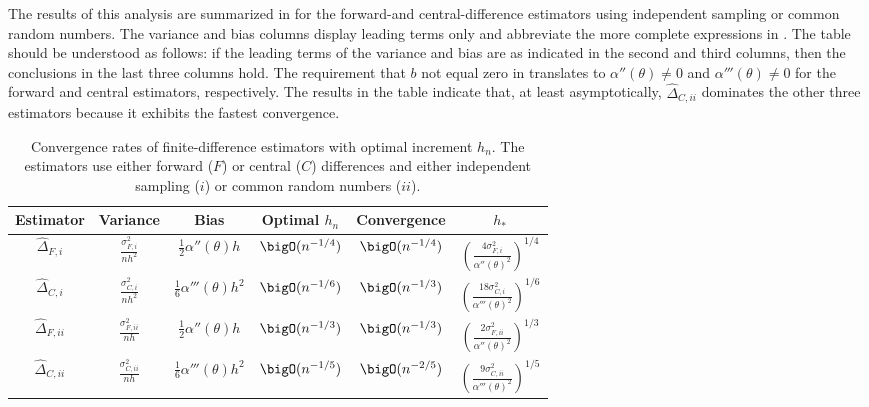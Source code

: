 The results of this analysis are summarized in  for the forward-and central-difference estimators using independent sampling or common random numbers. The variance and bias columns display leading terms only and abbreviate the more complete expressions in . The table should be understood as follows: if the leading terms of the variance and bias are as indicated in the second and third columns, then the conclusions in the last three columns hold. The requirement that \(b\) not equal zero in  translates to \(\alpha''(\theta) \neq 0\)
and \(\alpha'''(\theta) \neq 0\) for the forward and central estimators, respectively. The results in the table indicate that, at least asymptotically, \(\hat{\Delta}_{C,ii}\) dominates the other three estimators because it exhibits the fastest convergence.

\begin{table}[H]
	\centering
	\caption{Convergence rates of finite-difference estimators with optimal increment \(h_n\). The estimators use either forward (\(F\)) or central (\(C\)) differences and either independent sampling (\(i\)) or common random numbers (\(ii\)).}
	\label{tab:ConvergenceRates}
	\renewcommand{\arraystretch}{2.2}
	\begin{tabular}{cccccc}
		\toprule
		Estimator             & Variance                       & Bias                              & Optimal \(h_n\)     & Convergence       & \(h_*\)                                                             \\
		\midrule
		\(\hat{\Delta}_{F,i}\)  & \(\frac{\sigma_{F,i}^2}{n h^2}\) & \(\frac{1}{2}\alpha''(\theta)h\)    & \(\bigO(n^{-1/4})\) & \(\bigO(n^{-1/4})\) & \(\left(\frac{4\sigma_{F,i}^2}{\alpha''(\theta)^2}\right)^{1/4}\)   \\
		\(\hat{\Delta}_{C,i}\)  & \(\frac{\sigma_{C,i}^2}{n h^2}\) & \(\frac{1}{6}\alpha'''(\theta)h^2\) & \(\bigO(n^{-1/6})\) & \(\bigO(n^{-1/3})\) & \(\left(\frac{18\sigma_{C,i}^2}{\alpha'''(\theta)^2}\right)^{1/6}\) \\
		\(\hat{\Delta}_{F,ii}\) & \(\frac{\sigma_{F,ii}^2}{n h}\)  & \(\frac{1}{2}\alpha''(\theta)h\)    & \(\bigO(n^{-1/3})\) & \(\bigO(n^{-1/3})\) & \(\left(\frac{2\sigma_{F,ii}^2}{\alpha''(\theta)^2}\right)^{1/3}\)  \\
		\(\hat{\Delta}_{C,ii}\) & \(\frac{\sigma_{C,ii}^2}{n h}\)  & \(\frac{1}{6}\alpha'''(\theta)h^2\) & \(\bigO(n^{-1/5})\) & \(\bigO(n^{-2/5})\) & \(\left(\frac{9\sigma_{C,ii}^2}{\alpha'''(\theta)^2}\right)^{1/5}\) \\
		\bottomrule
	\end{tabular}
\end{table}

